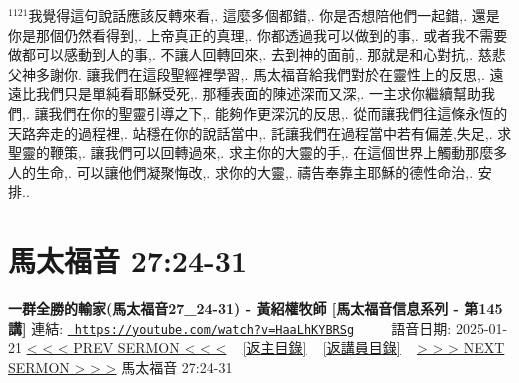 \documentclass{book}
\begin{document}
$^{1121}$我覺得這句說話應該反轉來看,.
這麼多個都錯,.
你是否想陪他們一起錯,.
還是你是那個仍然看得到,.
上帝真正的真理,.
你都透過我可以做到的事,.
或者我不需要做都可以感動到人的事,.
不讓人回轉回來,.
去到神的面前,.
那就是和心對抗,.
慈悲父神多謝你.
讓我們在這段聖經裡學習,.
馬太福音給我們對於在靈性上的反思,.
遠遠比我們只是單純看耶穌受死,.
那種表面的陳述深而又深,.
一主求你繼續幫助我們,.
讓我們在你的聖靈引導之下,.
能夠作更深沉的反思,.
從而讓我們往這條永恆的天路奔走的過程裡,.
站穩在你的說話當中,.
託讓我們在過程當中若有偏差,失足,.
求聖靈的鞭策,.
讓我們可以回轉過來,.
求主你的大靈的手,.
在這個世界上觸動那麼多人的生命,.
可以讓他們凝聚悔改,.
求你的大靈,.
禱告奉靠主耶穌的德性命治,.
安排..
\newpage



\section{馬太福音 27:24-31}
\label{sec:HaaLhKYBRSg}
\textbf{一群全勝的輸家(馬太福音27\_24-31) - 黃紹權牧師  [馬太福音信息系列 - 第145講]}
\newline
\newline
連結: \href{https://youtube.com/watch?v=HaaLhKYBRSg}{\texttt{ https://youtube.com/watch?v=HaaLhKYBRSg}} ~~~~ 語音日期: 2025-01-21 
\newline
\newline
\hyperref[sec:ZN4O4BAmHMA]{< < < PREV SERMON < < <}
~
\hyperlink{toc}{[返主目錄]}
~
\hyperref[ch:preacher15]{[返講員目錄]}
~
\hyperref[sec:oCpi7n8ictU]{> > > NEXT SERMON > > >}
\newline
\newline
馬太福音 27:24-31
\newline
\end{document}
